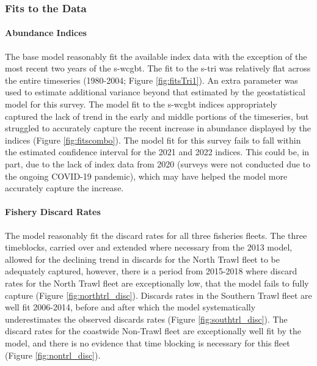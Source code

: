 \documentclass[11pt,
  english,
  letterpaper,
]{article}
\begin{document}
\hypertarget{fits-to-the-data}{%
\subsubsection{Fits to the Data}\label{fits-to-the-data}}

\hypertarget{abundance-indices}{%
\paragraph{Abundance Indices}\label{abundance-indices}}

The base model reasonably fit the available index data with the exception of the most recent two years of the \gls{s-wcgbt}. The fit to the \gls{s-tri} was relatively flat across the entire timeseries (1980-2004; Figure \ref{fig:fitsTri1}). An extra parameter was used to estimate additional variance beyond that estimated by the geostatistical model for this survey. The model fit to the \gls{s-wcgbt} indices appropriately captured the lack of trend in the early and middle portions of the timeseries, but struggled to accurately capture the recent increase in abundance displayed by the indices (Figure \ref{fig:fitscombo}). The model fit for this survey fails to fall within the estimated confidence interval for the 2021 and 2022 indices. This could be, in part, due to the lack of index data from 2020 (surveys were not conducted due to the ongoing COVID-19 pandemic), which may have helped the model more accurately capture the increase.

\hypertarget{fishery-discard-rates}{%
\paragraph{Fishery Discard Rates}\label{fishery-discard-rates}}

The model reasonably fit the discard rates for all three fisheries fleets. The three timeblocks, carried over and extended where necessary from the 2013 model, allowed for the declining trend in discards for the North Trawl fleet to be adequately captured, however, there is a period from 2015-2018 where discard rates for the North Trawl fleet are exceptionally low, that the model fails to fully capture (Figure \ref{fig:northtrl_disc}). Discards rates in the Southern Trawl fleet are well fit 2006-2014, before and after which the model systematically underestimates the observed discards rates (Figure \ref{fig:southtrl_disc}). The discard rates for the coastwide Non-Trawl fleet are exceptionally well fit by the model, and there is no evidence that time blocking is necessary for this fleet (Figure \ref{fig:nontrl_disc}).
\end{document}
